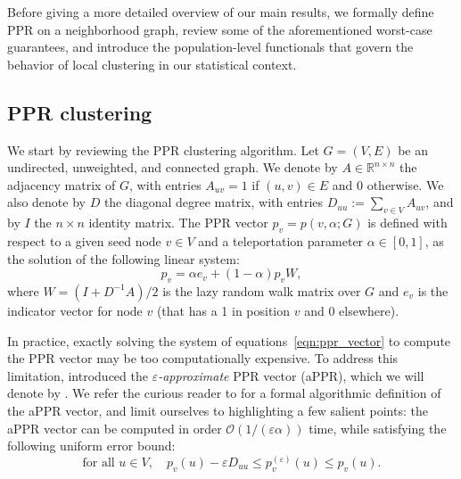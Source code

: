 \documentclass[11pt,twoside]{article}
\theoremstyle{definition}
\newcommand{\Reals}{\mathbb{R}}
\newcommand{\1}{\mathbf{1}}
\begin{document}
Before giving a more detailed overview of our main results, we formally define PPR on a neighborhood graph, review some of the aforementioned worst-case guarantees, and introduce the population-level functionals that govern the behavior of local clustering in our statistical context. 

\subsection{PPR clustering}
\label{subsec:ppr_clustering}
We start by reviewing the PPR clustering algorithm. Let $G = (V,E)$ be an undirected, unweighted, and connected graph. We denote by $A \in \Reals^{n \times n}$ the adjacency
matrix of $G$, with entries $A_{uv} = 1$ if $(u,v) \in E$ and $0$ otherwise.  We
also denote by $D$ the diagonal degree matrix, with entries $D_{uu} :=
\sum_{v \in V} A_{uv}$, and by $I$ the $n \times n$ identity matrix. The PPR vector $p_v = p(v,\alpha;G)$ is defined with respect to a given seed node $v \in V$ and a teleportation parameter $\alpha \in [0,1]$, as the solution of the following linear system:
\begin{equation}
\label{eqn:ppr_vector}
p_v = \alpha e_{v} + (1 - \alpha) p_v W,
\end{equation}
where $W = (I + D^{-1}A)/2$ is the lazy random walk matrix over
$G$ and $e_{v}$ is the indicator vector for node $v$ (that has a 1 in
position $v$ and 0 elsewhere). 

In practice, exactly solving the system of equations~\eqref{eqn:ppr_vector} to compute the PPR vector may be too computationally expensive. To address this limitation, \citet{andersen2006} introduced the \emph{$\varepsilon$-approximate} PPR vector (aPPR), which we will denote by . We refer the curious reader to \citet{andersen2006} for a formal algorithmic definition of the aPPR vector, and limit ourselves to highlighting a few salient points: the aPPR vector can be computed in order $\mathcal{O}(1/(\varepsilon\alpha))$ time, while satisfying the following uniform error bound: 
\begin{equation}
\label{eqn:appr_error}
\textrm{for all $u \in V$}, \quad p_v(u) - \varepsilon D_{uu}\leq
p_v^{(\varepsilon)}(u) \leq p_v(u).  
\end{equation}
\end{document}
